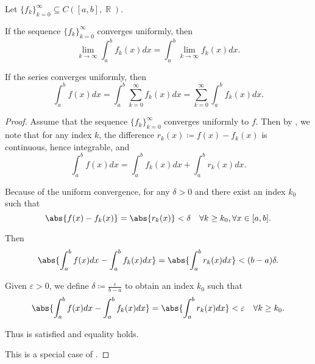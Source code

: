 \begin{corollary}\label{thm:riemann_intergral_limit_exchange}\mcite\cite[]{Фихтенгольц1968/2}
  Let \( \{ f_k \}_{k=0}^\infty \subseteq C([a, b], \BbbR) \).

  \begin{thmenum}
     If the sequence \( \{ f_k \}_{k=0}^\infty \) converges uniformly, then
    \begin{equation*}
      \lim_{k \to \infty} \int_a^b f_k(x) dx = \int_a^b \lim_{k \to \infty} f_k(x) dx.
    \end{equation*}

     If the series  converges uniformly, then
    \begin{equation*}
      \int_a^b f(x) dx = \int_a^b \sum_{k=0}^\infty f_k(x) dx = \sum_{k=0}^\infty \int_a^b f_k(x) dx.
    \end{equation*}
  \end{thmenum}
\end{corollary}
\begin{proof}
   Assume that the sequence \( \{ f_k \}_{k=0}^\infty \) converges uniformly to \( f \). Then by , we note that for any index \( k \), the difference \( r_k(x) \coloneqq f(x) - f_k(x) \) is continuous, hence integrable, and
  \begin{equation*}
    \int_a^b f(x) dx = \int_a^b f_k(x) dx + \int_a^b r_k(x) dx.
  \end{equation*}

  Because of the uniform convergence, for any \( \delta > 0 \) and there exist an index \( k_0 \) such that
  \begin{equation*}
    \abs{f(x) - f_k(x)} = \abs{r_k(x)} < \delta \quad\forall k \geq k_0, \forall x \in [a, b].
  \end{equation*}

  Then
  \begin{equation*}
    \abs{\int_a^b f(x) dx - \int_a^b f_k(x) dx} = \abs{\int_a^b r_k(x) dx} < (b - a) \delta.
  \end{equation*}

  Given \( \varepsilon > 0 \), we define \( \delta \coloneqq \frac \varepsilon {b - a} \) to obtain an index \( k_0 \) such that
  \begin{equation*}
    \abs{\int_a^b f(x) dx - \int_a^b f_k(x) dx} = \abs{\int_a^b r_k(x) dx} < \varepsilon \quad\forall k \geq k_0.
  \end{equation*}

  Thus  is satisfied and equality holds.

   This is a special case of .
\end{proof}

